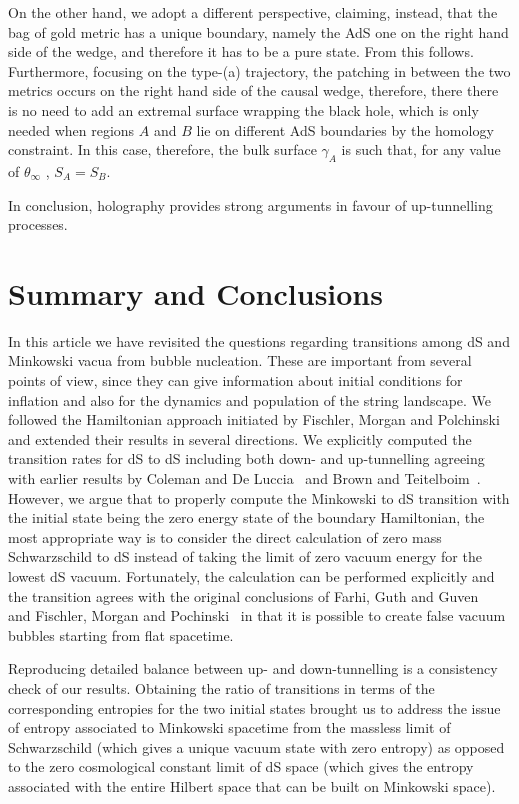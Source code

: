 \documentclass[11pt,a4paper]{article}
\begin{document}
On the other hand, we adopt a different perspective, claiming, instead, that the bag of gold metric has a unique boundary, namely the AdS one on the right hand side of the wedge, and therefore it has to be a pure state. From this follows. Furthermore, focusing on the type-(a) trajectory, the patching in between the two metrics occurs on the right hand side of the causal wedge, therefore, there there is no need to add an extremal surface wrapping the black hole, which is only needed when regions $A$ and $B$ lie on different AdS boundaries by the homology constraint. In this case, therefore, the bulk surface $\gamma_{A}$ is such that, for any value of $\theta_{\infty}$ , $S_{A}=S_{B}$. 

In conclusion, holography provides strong arguments in favour of up-tunnelling processes. 


\section{Summary and Conclusions}
\label{sec:Conclusions}

In this article we have revisited the questions regarding transitions among dS and Minkowski vacua from bubble nucleation. These are important from several points of view, since they can give information about initial conditions for inflation and also for the dynamics and population of the string landscape. We followed the Hamiltonian approach initiated by Fischler, Morgan and Polchinski~\cite{Fischler:1989se} and extended their results in several directions. We explicitly computed the transition rates for dS to dS including both down- and up-tunnelling agreeing with earlier results by Coleman and De Luccia~\cite{Coleman:1980aw} and Brown and Teitelboim~\cite{Brown:1988kg}. However, we argue that to properly compute the Minkowski to dS transition with the initial state being the zero energy state of the boundary Hamiltonian, the most appropriate way is to consider the direct calculation of zero mass Schwarzschild to dS instead of taking the limit of zero vacuum energy for the lowest dS vacuum. Fortunately, the calculation can be performed explicitly  and the transition agrees with the original conclusions of Farhi, Guth and Guven~\cite{Farhi:1989yr} and Fischler, Morgan and Pochinski~\cite{Fischler:1989se} in that it is possible to create  false vacuum bubbles starting from flat spacetime. 

Reproducing detailed balance between up- and down-tunnelling is a consistency check of our results. Obtaining the ratio of transitions in terms of the corresponding entropies for the two initial  states brought us to address the issue of entropy associated to Minkowski spacetime from the massless limit of Schwarzschild (which gives a unique vacuum state with zero entropy) as opposed to  the zero cosmological constant limit of dS space (which gives the entropy associated with the entire Hilbert space that can be built on Minkowski space). 
\end{document}
